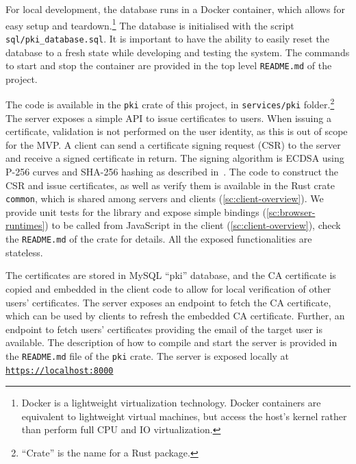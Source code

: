 For local development, 
the database runs in a Docker container, which allows
for easy setup and teardown.\footnote{Docker is a lightweight virtualization technology. Docker containers are equivalent to lightweight virtual machines, but access the host's kernel rather than perform full CPU and IO virtualization.} 
The database is initialised with the script \texttt{sql/pki\_database.sql}.
It is important to have the ability
to easily reset the database to a fresh state 
while developing and testing the system.
The commands to start and stop the container are provided
in the top level \texttt{README.md} of the project.

The code is available in the \texttt{pki} crate
of this project, in \texttt{services/pki} folder.\footnote{``Crate'' is the name for a Rust package.}
The server exposes a simple API
to issue certificates to users. 
When issuing a certificate, validation is not performed
on the user identity, as this is out of scope for the MVP.
A client can send a certificate signing request (CSR)
to the server and receive a signed certificate in return.
The signing algorithm is ECDSA using P-256 curves and SHA-256 hashing
as described in~\cite{rfc5758}.
The code to construct the CSR and issue certificates, as well as 
verify them is available in the Rust crate \texttt{common},
which is shared among servers and clients (\cref{sc:client-overview}).
We provide unit tests for the library and expose simple bindings (\cref{sc:browser-runtimes}) to be
called from JavaScript in the client (\cref{sc:client-overview}), check the \texttt{README.md}
of the crate for details. All the exposed functionalities are stateless.

The certificates are stored in MySQL ``pki'' database, and the CA
certificate is copied and embedded in the client code to allow
for local verification of other users' certificates.
The server exposes an endpoint to fetch the
CA certificate, which can be used by clients to
refresh the embedded CA certificate.
Further, an endpoint to fetch users' certificates providing the email of the target user is available.
The description of how to compile and start the server is
provided in the \texttt{README.md} file of the \texttt{pki} crate.
The server is exposed locally at \texttt{\url{https://localhost:8000}}



